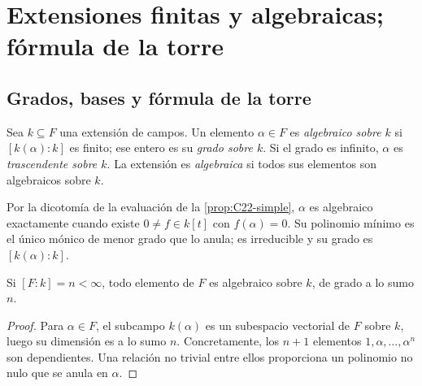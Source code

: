 \section{Extensiones finitas y algebraicas; fórmula de la torre}\label{sec:campos-algebraicas}

\subsection{Grados, bases y fórmula de la torre}\label{tema:23-1-1}\label{tema:23-1-2}
\begin{defi}
Sea $k\subseteq F$ una extensión de campos. Un elemento $\alpha\in F$ es \emph{algebraico sobre $k$} si $[k(\alpha):k]$ es finito; ese entero es su \emph{grado sobre $k$}. Si el grado es infinito, $\alpha$ es \emph{trascendente sobre $k$}. La extensión es \emph{algebraica} si todos sus elementos son algebraicos sobre $k$.
\end{defi}
Por la dicotomía de la evaluación de la \cref{prop:C22-simple}, $\alpha$ es algebraico exactamente cuando existe $0\ne f\in k[t]$ con $f(\alpha)=0$. Su polinomio mínimo es el único mónico de menor grado que lo anula; es irreducible y su grado es $[k(\alpha):k]$.

\begin{lema}\label{lema:C23-finita-algebraica}
Si $[F:k]=n<\infty$, todo elemento de $F$ es algebraico sobre $k$, de grado a lo sumo $n$.
\end{lema}
\begin{proof}
Para $\alpha\in F$, el subcampo $k(\alpha)$ es un subespacio vectorial de $F$ sobre $k$, luego su dimensión es a lo sumo $n$. Concretamente, los $n+1$ elementos $1,\alpha,\ldots,\alpha^n$ son dependientes. Una relación no trivial entre ellos proporciona un polinomio no nulo que se anula en $\alpha$.
\end{proof}

